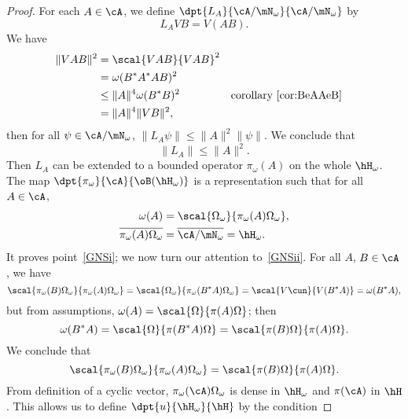 \begin{proof}
For each $A\in\cA$, we define $\dpt{L_A}{\cA/\mN_{\omega}}{\cA/\mN_{\omega}}$ by
\begin{equation}  \label{eq:defpiomega}
L_AVB=V(AB).
\end{equation}
We have
\begin{equation}
\begin{aligned}
\| VAB \|^2&=\scal{VAB}{VAB}^2\\
        &=\omega(B^*A^*AB)^2\\
        &\leq \| A \|^4\omega(B^*B)^2&&\textrm{corollary~\ref{cor:BeAAeB}}\\
        &=\| A \|^4\| VB \|^2,
\end{aligned}
\end{equation}
then for all $\psi\in\cA/\mN_{\omega}$, $\| L_A\psi \|\leq \| A \|^2\| \psi \|$. We conclude that
\begin{equation}
  \| L_A \|\leq \| A \|^2.
\end{equation}
Then $L_A$ can be extended to a bounded operator $\pi_{\omega}(A)$ on the whole $\hH_{\omega}$. The map $\dpt{\pi_{\omega}}{\cA}{\oB(\hH_{\omega})}$ is a representation such that for all $A\in\cA$,
\begin{subequations}
\begin{align}
\omega(A)&=\scal{\Omega_{\omega}}{\pi_{\omega}(A)\Omega_{\omega}},\\
\overline{ \pi_{\omega}(A)\Omega_{\omega} }&=\overline{ \cA/\mN_{\omega} }=\hH_{\omega}.
\end{align}
\end{subequations}
It proves point~\ref{GNSi}; we now turn our attention to~\ref{GNSii}. For all $A$, $B\in\cA$, we have
\begin{equation}  \label{eq_r1903r4}
\scal{\pi_{\omega}(B)\Omega_{\omega}}{\pi_{\omega}(A)\Omega_{\omega}}=\scal{\Omega_{\omega}}{\pi_{\omega}(B^*A)\Omega_{\omega}}
        =\scal{V\cun}{V(B^*A)}
        =\omega(B^*A),
\end{equation}
but from assumptions, $\omega(A)=\scal{\Omega}{\pi(A)\Omega}$; then
\begin{equation} \label{eq:BesAOmBeA}
  \omega(B^*A)=\scal{\Omega}{\pi(B^*A)\Omega}
        =\scal{\pi(B)\Omega}{\pi(A)\Omega}.
\end{equation}
We conclude that
\begin{equation}
  \scal{\pi_{\omega}(B)\Omega_{\omega}}{\pi_{\omega}(A)\Omega_{\omega}}=
    \scal{\pi(B)\Omega}{\pi(A)\Omega}.
\end{equation}
From definition of a cyclic vector, $\pi_{\omega}(\cA)\Omega_{\omega}$ is dense in $\hH_{\omega}$ and $\pi(\cA)$ in $\hH$. This allows us to define $\dpt{u}{\hH_{\omega}}{\hH}$ by the condition

\end{proof}
